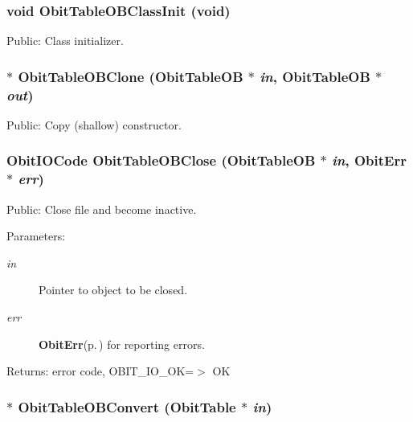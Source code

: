 \subsubsection{\setlength{\rightskip}{0pt plus 5cm}void Obit\-Table\-OBClass\-Init (void)}\label{ObitTableOB_8h_a10}


Public: Class initializer. 

\subsubsection{$\ast$ Obit\-Table\-OBClone ({\bf Obit\-Table\-OB} $\ast$ {\em in}, {\bf Obit\-Table\-OB} $\ast$ {\em out})}\label{ObitTableOB_8h_a15}


Public: Copy (shallow) constructor. 

\subsubsection{\setlength{\rightskip}{0pt plus 5cm}Obit\-IOCode Obit\-Table\-OBClose ({\bf Obit\-Table\-OB} $\ast$ {\em in}, {\bf Obit\-Err} $\ast$ {\em err})}\label{ObitTableOB_8h_a21}


Public: Close file and become inactive. 

\begin{Desc}
\item[Parameters:]
\begin{description}
\item[{\em in}]Pointer to object to be closed. \item[{\em err}]{\bf Obit\-Err}{\rm (p.\,\pageref{structObitErr})} for reporting errors. \end{description}
\end{Desc}
\begin{Desc}
\item[Returns:]error code, OBIT\_\-IO\_\-OK=$>$ OK \end{Desc}
\subsubsection{$\ast$ Obit\-Table\-OBConvert ({\bf Obit\-Table} $\ast$ {\em in})}\label{ObitTableOB_8h_a16}



